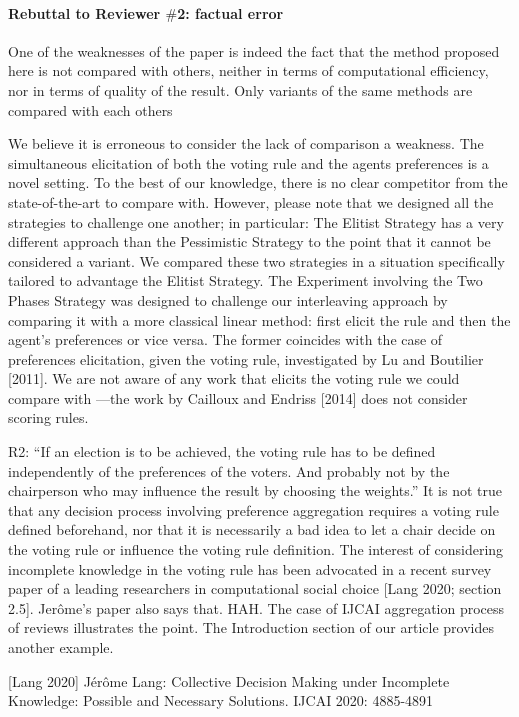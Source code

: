 \documentclass{article}
\begin{document}
\paragraph{Rebuttal to Reviewer $\#$2: factual error}
One of the weaknesses of the paper is indeed the fact that the method proposed here is not compared with others, neither in terms of computational efficiency, nor in terms of quality of the result. Only variants of the same methods are compared with each others

We believe it is erroneous to consider the lack of comparison a weakness. The simultaneous elicitation of both the voting rule and the agents preferences is a novel setting. To the best of our knowledge, there is no clear competitor from the state-of-the-art to compare with. However, please note that we designed all the strategies to challenge one another; in particular:
The Elitist Strategy has a very different approach than the Pessimistic Strategy to the point that it cannot be considered a variant. We compared these two strategies in a situation specifically tailored to advantage the Elitist Strategy.
The Experiment involving the Two Phases Strategy was designed to challenge our interleaving approach by comparing it with a more classical linear method: first elicit the rule and then the agent’s preferences or vice versa. The former coincides with the case of preferences elicitation, given the voting rule, investigated by Lu and Boutilier [2011].
We are not aware of any work that elicits the voting rule we could compare with —the work by Cailloux and Endriss [2014] does not consider scoring rules.

R2: “If an election is to be achieved, the voting rule has to be defined independently of the preferences of the voters. And probably not by the chairperson who may influence the result by choosing the weights.”
It is not true that any decision process involving preference aggregation requires a voting rule defined beforehand, nor that it is necessarily a bad idea to let a chair decide on the voting rule or influence the voting rule definition. The interest of considering incomplete knowledge in the voting rule has been advocated in a recent survey paper of a leading researchers in computational social choice [Lang 2020; section 2.5]. Jerôme’s paper also says that. HAH. The case of IJCAI aggregation process of reviews illustrates the point. The Introduction section of our article provides another example.

[Lang 2020] Jérôme Lang: Collective Decision Making under Incomplete Knowledge: Possible and Necessary Solutions. IJCAI 2020: 4885-4891
\end{document}
